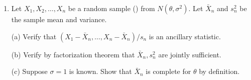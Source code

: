 \begin{enumerate}
\item
Let $X_1, X_2, \ldots, X_n$ be a random sample (\iid)
from $N(\theta, \sigma^2)$.
Let $\bar X_n$ and $s_n^2$ be the sample mean and variance.

(a) Verify that $(X_1 - \bar X_n, \ldots, X_n - \bar X_n)/s_n$ is
an ancillary statistic.

(b) Verify by factorization theorem that $\bar X_n, s_n^2$ are jointly
sufficient.  

(c) Suppose $\sigma = 1$ is known. Show that $\bar X_n$
is complete for $\theta$ by definition. 

%
%
%
%
%
%
%
%

\end{enumerate}
